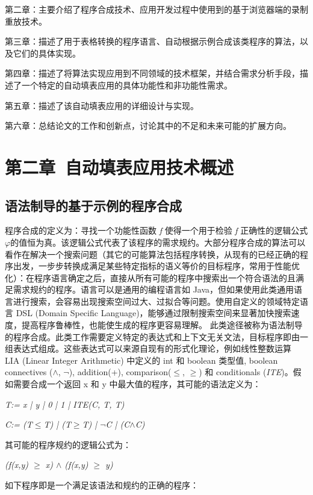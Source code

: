 \documentclass[design, pageheader]{njubachelor}
\begin{document}
第二章：主要介绍了程序合成技术、应用开发过程中使用到的基于浏览器端的录制重放技术。

第三章：描述了用于表格转换的程序语言、自动根据示例合成该类程序的算法，以及它们的具体实现。

第四章：描述了将算法实现应用到不同领域的技术框架，并结合需求分析手段，描述了一个特定的自动填表应用的具体功能性和非功能性需求。

第五章：描述了该自动填表应用的详细设计与实现。

第六章：总结论文的工作和创新点，讨论其中的不足和未来可能的扩展方向。

\section{第二章~自动填表应用技术概述}

\subsection{语法制导的基于示例的程序合成}
程序合成的定义为：寻找一个功能性函数 {\itshape f} 使得一个用于检验 {\itshape f} 正确性的逻辑公式$\varphi$的值恒为真。该逻辑公式代表了该程序的需求规约。\cite{alur13}大部分程序合成的算法可以看作在解决一个搜索问题（其它的可能算法包括程序转换，从现有的已经正确的程序出发，一步步转换成满足某些特定指标的语义等价的目标程序，常用于性能优化\cite{schkufza16}）：在程序语言确定之后，直接从所有可能的程序中搜索出一个符合语法的且满足需求规约的程序。语言可以是通用的编程语言如 Java，但如果使用此类通用语言进行搜索，会容易出现搜索空间过大、过拟合等问题。使用自定义的领域特定语言 DSL (Domain Specific Language)，能够通过限制搜索空间来显著加快搜索速度，提高程序鲁棒性，也能使生成的程序更容易理解。\cite{alur13} 此类途径被称为语法制导的程序合成。此类工作需要定义特定的表达式和上下文无关文法，目标程序即由一组表达式组成。这些表达式可以来源自现有的形式化理论，例如线性整数运算 LIA (Linear Integer Arithmetic) 中定义的 int 和 boolean 类型值, boolean connectives ($\wedge$, $\neg$), addition(+), comparison($\leq$, $\geq$) 和 conditionals ({\itshape ITE})。假如需要合成一个返回 x 和 y 中最大值的程序，其可能的语法定义为：

{\itshape T:= x | y | 0 | 1  | ITE(C, T, T)}

{\itshape C:= (T$\leq$T) | (T$\geq$T) | $\neg$C | (C$\wedge$C)}

其可能的程序规约的逻辑公式为：

{\itshape (f(x,y) $\geq$ x) $\wedge$ (f(x,y) $\geq$ y) }

如下程序即是一个满足该语法和规约的正确的程序：
\end{document}
